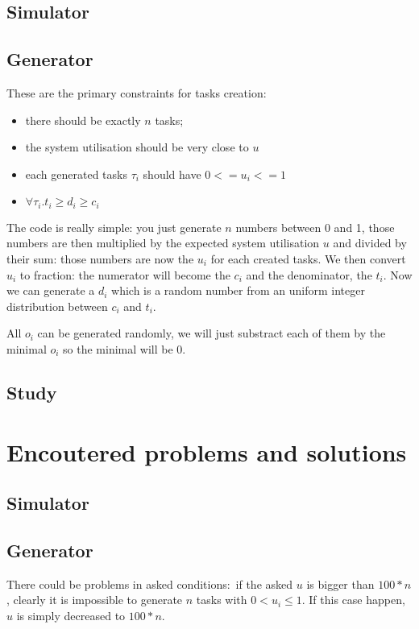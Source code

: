 \documentclass{scrartcl}
\begin{document}
\subsection{Simulator}

\subsection{Generator}
\label{gendesc}
These are the primary constraints for tasks creation:
\begin{itemize}
  \item there should be exactly $n$ tasks;
  \item the system utilisation should be very close to $u$
  \item each generated tasks $\tau_i$ should have $0 <= u_i <= 1$
  \item $\forall \tau_i. t_i \geq d_i \geq c_i$
\end{itemize}

The code is really simple: you just generate $n$ numbers between 0 and 1, those numbers are then multiplied by the expected system utilisation $u$ and divided by their sum: those numbers are now the $u_i$ for each created tasks.
We then convert $u_i$ to fraction: the numerator will become the $c_i$ and the denominator, the $t_i$. Now we can generate a $d_i$ which is a random number from an uniform integer distribution between $c_i$ and $t_i$.

All $o_i$ can be generated randomly, we will just substract each of them by the minimal $o_i$ so the minimal will be 0.

\subsection{Study}

\section{Encoutered problems and solutions}

\subsection{Simulator}

\subsection{Generator}
There could be problems in asked conditions: if the asked $u$ is bigger than $100 * n$, clearly it is impossible to generate $n$ tasks with $0 < u_i \leq 1$. If this case happen, $u$ is simply decreased to $100 * n$.
\end{document}

